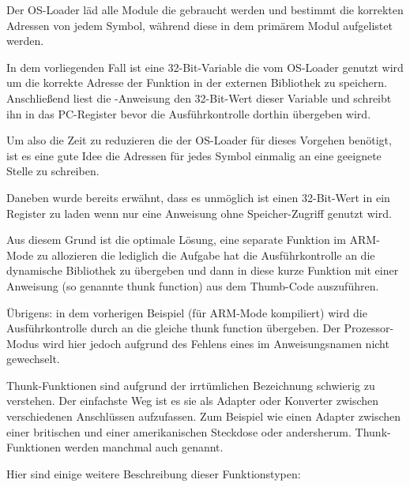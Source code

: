 Der \ac{OS}-Loader läd alle Module die gebraucht werden und bestimmt die korrekten Adressen von jedem Symbol,
während diese in dem primärem Modul aufgelistet werden.

In dem vorliegenden Fall ist  eine 32-Bit-Variable die vom \ac{OS}-Loader genutzt wird
um die korrekte Adresse der Funktion in der externen Bibliothek zu speichern.
Anschließend liest die -Anweisung den 32-Bit-Wert dieser Variable und schreibt ihn in das \ac{PC}-Register
bevor die Ausführkontrolle dorthin übergeben wird.

Um also die Zeit zu reduzieren die der \ac{OS}-Loader für dieses Vorgehen benötigt, ist es eine gute Idee
die Adressen für jedes Symbol einmalig an eine geeignete Stelle zu schreiben.

Daneben wurde bereits erwähnt, dass es unmöglich ist einen 32-Bit-Wert in ein Register zu laden wenn
nur eine Anweisung ohne Speicher-Zugriff genutzt wird.

Aus diesem Grund ist die optimale Lösung, eine separate Funktion im ARM-Mode zu allozieren die lediglich
die Aufgabe hat die Ausführkontrolle an die dynamische Bibliothek zu übergeben und dann in diese kurze
Funktion mit einer Anweisung (so genannte \gls{thunk function}) aus dem Thumb-Code auszuführen.

Übrigens: in dem vorherigen Beispiel (für ARM-Mode kompiliert) wird die Ausführkontrolle durch 
an die gleiche \gls{thunk function} übergeben.
Der Prozessor-Modus wird hier jedoch aufgrund des Fehlens eines  im Anweisungsnamen nicht gewechselt.


Thunk-Funktionen sind aufgrund der irrtümlichen Bezeichnung schwierig zu verstehen.
Der einfachste Weg ist es sie als Adapter oder Konverter zwischen verschiedenen Anschlüssen aufzufassen.
Zum Beispiel wie einen Adapter zwischen einer britischen und einer amerikanischen Steckdose oder andersherum.
Thunk-Funktionen werden manchmal auch  genannt.

Hier sind einige weitere Beschreibung dieser Funktionstypen:


